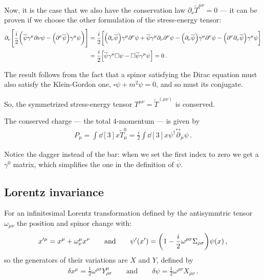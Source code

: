 \documentclass[main.tex]{subfiles}
\begin{document}
Now, it is the case that we also have the conservation law \(\partial_{\nu } \widetilde{T}^{\mu \nu } = 0\) --- it can be proven if we choose the other formulation of the stress-energy tensor:
%
\begin{align}
\partial_{\nu } \qty[\frac{i}{2} \qty(\overline{\psi} \gamma^{\mu }\partial{\nu } \psi - \qty(\partial^{\nu } \overline{\psi}) \gamma^{\mu } \psi )]
&= \frac{i}{2} \qty[\qty(\partial_{\nu } \overline{\psi}) \gamma^{\mu } \partial^{\nu } \psi 
+ \overline{\psi} \gamma^{\mu } \partial_{\nu } \partial^{\nu } \psi 
- \qty(\partial_{\nu } \overline{\psi}) \gamma^{\mu } \partial^{\nu } \psi 
- \qty(\partial^{\nu } \partial_{\nu } \overline{\psi}) \gamma^{\mu } \psi  ]  \\
&= \frac{i}{2} 
\qty[ \overline{\psi} \gamma^{\mu }\square \psi - \square \overline{\psi} \gamma^{\mu } \psi ] = 0
\,.
\end{align}

The result follows from the fact that a spinor satisfying the Dirac equation must also satisfy the Klein-Gordon one, \(\square \psi  +m^2 \psi = 0\), and so must its conjugate. 

So, the symmetrized stress-energy tensor \(T^{\mu \nu } = \widetilde{T}^{(\mu \nu )}\) is conserved. 

The conserved charge --- the total 4-momentum --- is given by 
%
\begin{align}
P_{\mu } = \int \dd[3]{x} \widetilde{T}^{0}_{\mu } = \frac{i}{2} 
\int \dd[3]{x} \psi ^\dag \overset{\leftrightarrow}{\partial}_{\mu }\psi   
\,.
\end{align}

Notice the dagger instead of the bar: when we set the first index to zero we get a \(\gamma^{0}\) matrix, which simplifies the one in the definition of \(\overline{\psi}\). 

\subsection{Lorentz invariance}

For an infinitesimal Lorentz transformation defined by the antisymmtric tensor \(\omega_{\mu \nu }\) the position and spinor change with: 
%
\begin{align}
x^{\prime \mu } = x^{\mu } + \omega^{\mu }_{\nu } x^{\nu }
\qquad \text{and} \qquad
\psi^{\prime }( x') 
= \qty(1 - \frac{i}{2} \omega^{\rho \sigma } \Sigma_{\rho \sigma }) \psi (x)
\,,
\end{align}
%
so the generators of their variations are \(X\) and \(Y\), defined by 
%
\begin{align}
\delta x^{\mu } = \frac{1}{2} \omega^{\rho \sigma } Y^{\mu }_{\rho \sigma }
\qquad \text{and} \qquad
\delta \psi = \frac{1}{2} \omega^{\rho \sigma } X_{\mu \nu }
\,.
\end{align}
\end{document}
